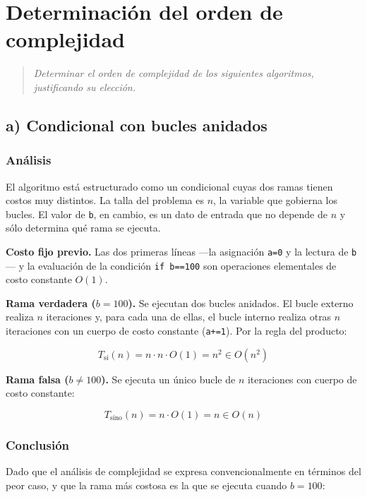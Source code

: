 \documentclass[12pt]{article}
\newcommand{\codigo}[1]{\texttt{\small #1}}
\newcommand{\codigopython}[2]{%
}
\newcommand{\enunciado}[1]{%
    \begin{quote}
        \itshape #1
    \end{quote}
}
\begin{document}
\section{Determinación del orden de complejidad}

\enunciado{Determinar el orden de complejidad de los siguientes algoritmos, justificando su elección.}

\subsection{a) Condicional con bucles anidados}

\codigopython{ej07_a_condicional_anidado}{Algoritmo con bucles dependientes de una condición}

\subsubsection*{Análisis}

El algoritmo está estructurado como un condicional cuyas dos ramas tienen costos muy distintos. La talla del problema es $n$, la variable que gobierna los bucles. El valor de \codigo{b}, en cambio, es un dato de entrada que no depende de $n$ y sólo determina qué rama se ejecuta.

\textbf{Costo fijo previo.} Las dos primeras líneas —la asignación \codigo{a=0} y la lectura de \codigo{b}— y la evaluación de la condición \codigo{if b==100} son operaciones elementales de costo constante $O(1)$.

\textbf{Rama verdadera ($b = 100$).} Se ejecutan dos bucles anidados. El bucle externo realiza $n$ iteraciones y, para cada una de ellas, el bucle interno realiza otras $n$ iteraciones con un cuerpo de costo constante (\codigo{a+=1}). Por la regla del producto:

\[
T_{\text{si}}(n) = n \cdot n \cdot O(1) = n^2 \in O(n^2)
\]

\textbf{Rama falsa ($b \ne 100$).} Se ejecuta un único bucle de $n$ iteraciones con cuerpo de costo constante:

\[
T_{\text{sino}}(n) = n \cdot O(1) = n \in O(n)
\]

\subsubsection*{Conclusión}

Dado que el análisis de complejidad se expresa convencionalmente en términos del peor caso, y que la rama más costosa es la que se ejecuta cuando $b = 100$:
\end{document}
